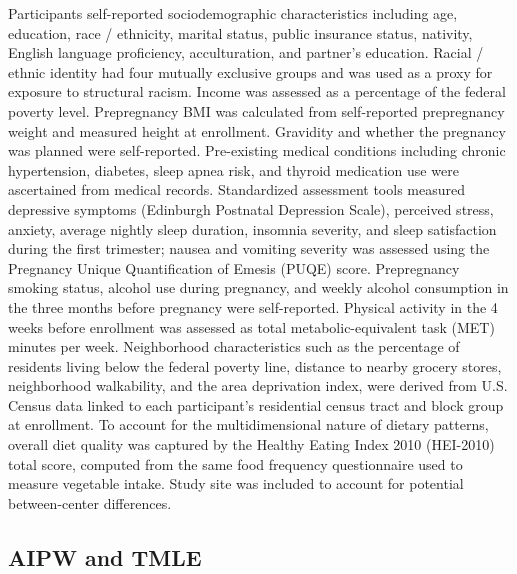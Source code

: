 \documentclass[12pt]{article}
\begin{document}
Participants self-reported sociodemographic characteristics including age, education, race / ethnicity, marital status, public insurance status, nativity, English language proficiency, acculturation, and partner's education. Racial / ethnic identity had four mutually exclusive groups and was used as a proxy for exposure to structural racism.\cite{Ukoha2022} Income was assessed as a percentage of the federal poverty level. Prepregnancy BMI was calculated from self-reported prepregnancy weight and measured height at enrollment. Gravidity and whether the pregnancy was planned were self-reported. Pre-existing medical conditions including chronic hypertension, diabetes, sleep apnea risk, and thyroid medication use were ascertained from medical records. Standardized assessment tools\cite{Haas2015} measured depressive symptoms (Edinburgh Postnatal Depression Scale), perceived stress, anxiety, average nightly sleep duration, insomnia severity, and sleep satisfaction during the first trimester; nausea and vomiting severity was assessed using the Pregnancy Unique Quantification of Emesis (PUQE) score. Prepregnancy smoking status, alcohol use during pregnancy, and weekly alcohol consumption in the three months before pregnancy were self-reported. Physical activity in the 4 weeks before enrollment was assessed as total metabolic-equivalent task (MET) minutes per week.\cite{Piercy2018} Neighborhood characteristics such as the percentage of residents living below the federal poverty line, distance to nearby grocery stores, neighborhood walkability,\cite{Walker2013} and the area deprivation index,\cite{Kind2018} were derived from U.S. Census data linked to each participant's residential census tract and block group at enrollment. To account for the multidimensional nature of dietary patterns, overall diet quality was captured by the Healthy Eating Index 2010 (HEI-2010) total score, computed from the same food frequency questionnaire used to measure vegetable intake. Study site was included to account for potential between-center differences.

\subsection{AIPW and TMLE}
\end{document}

